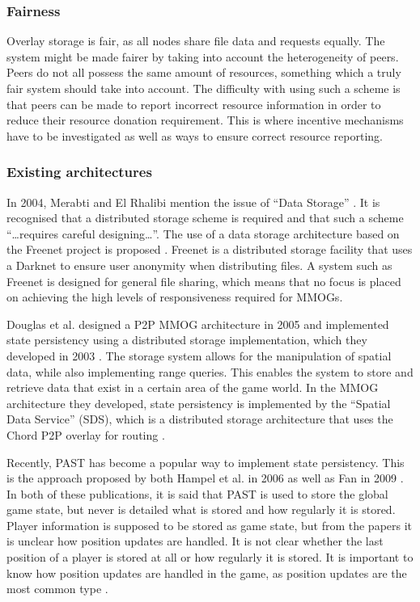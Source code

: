 \documentclass[10pt,a4paper,journal,cspaper,compsoc]{IEEEtran}
\begin{document}
\subsubsection{Fairness}

Overlay storage is fair, as all nodes share file data and requests equally. The system might be made fairer by taking into account the heterogeneity
of peers. Peers do not all possess the same amount of resources, something which a truly fair system should take into account. The difficulty with
using such a scheme is that peers can be made to report incorrect resource information in order to reduce their resource donation requirement. This
is where incentive mechanisms have to be investigated as well as ways to ensure correct resource reporting.

\subsubsection{Existing architectures}

In 2004, Merabti and El Rhalibi mention the issue of ``Data Storage'' \cite{using_freenet_storage}. It is recognised that a distributed storage
scheme is required and that such a scheme ``\ldots requires careful designing\ldots''. The use of a data storage architecture based on the Freenet
project is proposed \cite{clarke_freenet}. Freenet is a distributed storage facility that uses a Darknet to ensure user anonymity when distributing
files. A system such as Freenet is designed for general file sharing, which means that no focus is placed on achieving the high levels of
responsiveness required for MMOGs.

Douglas et al. designed a P2P MMOG architecture in 2005 \cite{Douglas05enablingmassively} and implemented state persistency using a distributed
storage implementation, which they developed in 2003 \cite{Harwood03hashingspatial}. The storage system allows for the manipulation of spatial data,
while also implementing range queries. This enables the system to store and retrieve data that exist in a certain area of the game world. In the MMOG
architecture they developed, state persistency is implemented by the ``Spatial Data Service'' (SDS), which is a distributed storage architecture that
uses the Chord P2P overlay for routing \cite{chord}.

Recently, PAST has become a popular way to implement state persistency. This is the approach proposed by both Hampel et al. in 2006
\cite{past_storage_focus} as well as Fan in 2009 \cite{Fan_phd}. In both of these publications, it is said that PAST is used to store the global game
state, but never is detailed what is stored and how regularly it is stored. Player information is supposed to be stored as game state, but from the
papers it is unclear how position updates are handled. It is not clear whether the last position of a player is stored at all or how regularly it is
stored. It is important to know how position updates are handled in the game, as position updates are the most common type \cite{knutsson_p2p_first}.
\end{document}
